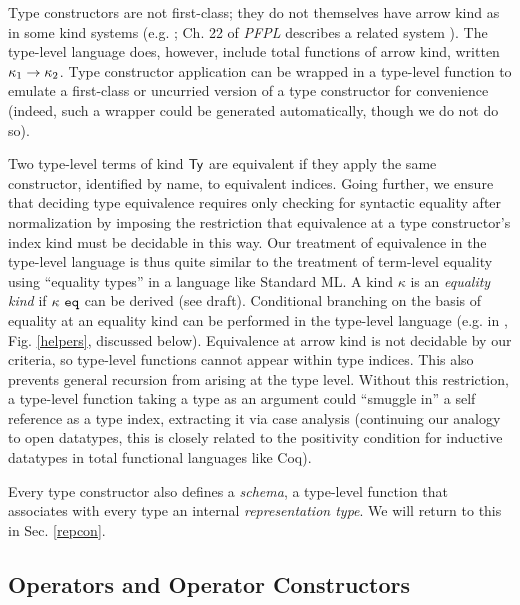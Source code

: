  Type constructors are not first-class; they do not themselves have arrow kind as in some kind systems (e.g.  \cite{watkins2008specifying}; Ch. 22 of \emph{PFPL} describes a related system \cite{pfpl}). The type-level language does, however, include total functions of arrow kind, written $\kappa_1\rightarrow{\kappa_2}$. Type constructor application can be wrapped in a type-level function to emulate a first-class or uncurried version of a type constructor for convenience (indeed, such a wrapper could be generated automatically, though we do not do so). 

Two type-level terms of kind $\textsf{Ty}$ are equivalent if they apply the same constructor, identified by name, to equivalent indices. Going further, we ensure that deciding type equivalence requires only checking for syntactic equality after normalization by imposing the restriction that equivalence at a type constructor's index kind must be decidable in this way. Our treatment of equivalence in the type-level language is thus quite similar to the treatment of term-level equality using ``equality types'' in a language like Standard ML. A kind $\kappa$ is an  \emph{equality kind} if $\kappa~\mathtt{eq}$ can be derived (see draft). Conditional branching on the basis of equality at an equality kind can be performed in the type-level language (e.g. in , Fig. \ref{helpers}, discussed below). Equivalence at arrow kind is not decidable by our criteria, so type-level functions cannot appear within type indices. This also prevents general recursion from arising at the type level. Without this restriction, a type-level function taking a type as an argument could ``smuggle in'' a self reference as a type index, extracting it via case analysis (continuing our analogy to open datatypes, this is closely related to the positivity condition for inductive datatypes in total functional languages like Coq).%

Every type constructor also defines a \emph{schema}, a type-level function that associates with every type an internal \emph{representation type}. We will return to this in Sec. \ref{repcon}. 

\subsection{Operators and Operator Constructors}\label{opcons}

